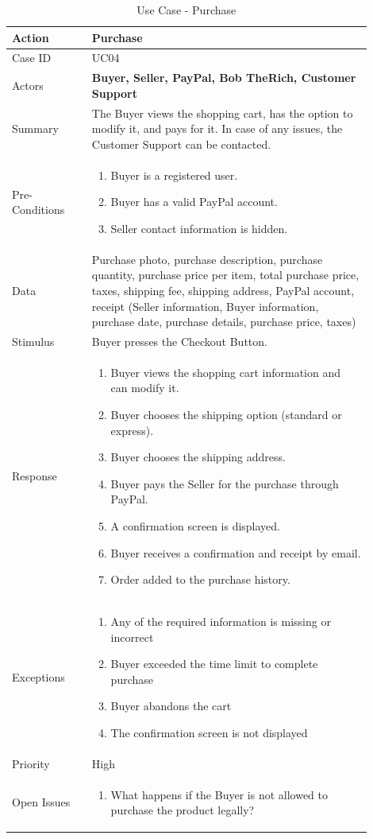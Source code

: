 \documentclass[11pt]{article}
\newcounter{use case ID}
\newcommand\tabularhead[1]{
    \begin{table}[ht]
        \addtocounter{use case ID}{1}
        \caption{Use Case \arabic{use case ID} - #1}
        \vspace{0.2cm}
        \begin{tabular}{|p{0.2\linewidth}|p{0.70\linewidth}|}
            \hline
            \textbf{Action} & \textbf{#1} \\
            \hline}
\newcommand\addrow[2]{#1 & #2\\ \hline}
\newcommand\addmulrow[2]{ \begin{minipage}[t][][t]{2.5cm}#1\end{minipage}
                &\begin{minipage}[t][][t]{11cm}
                    \begin{enumerate}[itemsep=-1ex] #2   \end{enumerate}
                \end{minipage}\vfill\\ \hline}
\newenvironment{usecase}{\tabularhead}
        {\hline\end{tabular}\end{table}}
\newcounter{req ID}
\begin{document}
\begin{usecase}{Purchase}
    \addrow{Case ID}{UC04}
    \addrow{Actors}{\textbf{Buyer, Seller, PayPal, Bob TheRich, Customer Support}}
    \addrow{Summary}{The Buyer views the shopping cart, has the option to modify it, and pays for it. In case of any issues, the Customer Support can be contacted.}
    \addmulrow{Pre-Conditions}{
        \item \index{buyer}Buyer is a \index{registered user}registered user.
        \item Buyer has a valid \index{PayPal}PayPal account.
        \item \index{seller}Seller contact information is hidden.
    }
    \addrow{\index{data}Data}{Purchase photo, purchase description, purchase quantity, purchase price per item, total purchase price, taxes, shipping fee, shipping address, PayPal account, \index{receipt}receipt (Seller \index{information}information, Buyer information, purchase date, purchase details, purchase price, taxes)}
    \addrow{Stimulus}{Buyer presses the Checkout Button.}
    \addmulrow{Response}{
            \item \index{buyer}Buyer views the shopping cart information and can modify it.
            \item Buyer chooses the shipping option (standard or express).
            \item Buyer chooses the shipping address.
            \item Buyer pays the \index{seller}Seller for the purchase through \index{PayPal}PayPal.
            \item A confirmation screen is displayed.
            \item Buyer receives a confirmation and \index{receipt}receipt by email.
            \item Order added to the purchase history.
    }
    \addmulrow{Exceptions}{
        \item Any of the required \index{information}information is missing or incorrect
        \item \index{buyer}Buyer exceeded the time limit to complete purchase
        \item Buyer abandons the cart
        \item The confirmation screen is not displayed
    }
    \addrow{Priority}{High}
    \addmulrow{Open Issues}{
        \item What happens if the \index{buyer}Buyer is not allowed to purchase the \index{product}product legally?
    }

\end{usecase}
\end{document}
